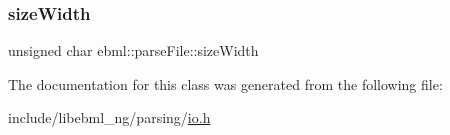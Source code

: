 \mbox{\label{classebml_1_1parseFile_ad13d3f7ac6cc6119754bda17260657fd}} 
\subsubsection{\texorpdfstring{size\+Width}{sizeWidth}}
{\footnotesize\ttfamily unsigned char ebml\+::parse\+File\+::size\+Width}



The documentation for this class was generated from the following file\+:\begin{DoxyCompactItemize}
\item 
include/libebml\+\_\+ng/parsing/\mbox{\hyperlink{parsing_2io_8h}{io.\+h}}\end{DoxyCompactItemize}
